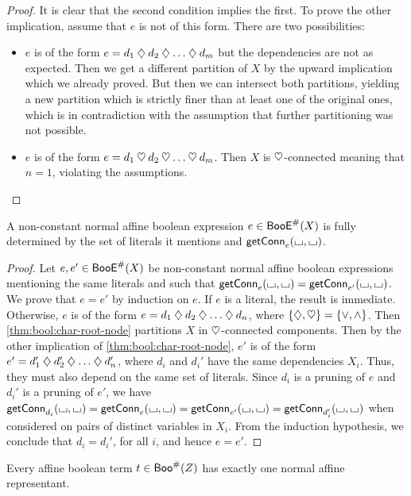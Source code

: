 \documentclass[a4paper]{memoir}
\begin{document}
\begin{proof}
	It is clear that the second condition implies the first.
	To prove the other implication, assume that $e$ is not of this form.
	There are two possibilities:
	\begin{itemize}
		\item $e$ is of the form $e = d_1 \mathbin{\diamondsuit} d_2 \mathbin{\diamondsuit} \ldots \mathbin{\diamondsuit} d_m$ but the dependencies are not as expected.
		Then we get a different partition of $X$ by the upward implication which we already proved.
		But then we can intersect both partitions, yielding a new partition which is strictly finer than at least one of the original ones, which is in contradiction with the assumption that further partitioning was not possible.
		\item $e$ is of the form $e = d_1 \mathbin{\heartsuit} d_2 \mathbin{\heartsuit} \ldots \mathbin{\heartsuit} d_m$. Then $X$ is $\mathbin{\heartsuit}$-connected meaning that $n = 1$, violating the assumptions. \qedhere
	\end{itemize}
\end{proof}
\begin{lemma} \label{thm:bool:normal-from-graph}
	A non-constant normal affine boolean expression $e \in \mathsf{BooE}^\#(X)$ is fully determined by the set of literals it mentions and $\mathsf{getConn}_{e}({\llcorner\hspace{-.4ex}\lrcorner}, {\llcorner\hspace{-.4ex}\lrcorner})$.
\end{lemma}
\begin{proof}
	Let $e, e' \in \mathsf{BooE}^\#(X)$ be non-constant normal affine boolean expressions mentioning the same literals and such that $\mathsf{getConn}_{e}({\llcorner\hspace{-.4ex}\lrcorner}, {\llcorner\hspace{-.4ex}\lrcorner}) = \mathsf{getConn}_{e'}({\llcorner\hspace{-.4ex}\lrcorner}, {\llcorner\hspace{-.4ex}\lrcorner})$.
	We prove that $e = e'$ by induction on $e$.
	If $e$ is a literal, the result is immediate.
	Otherwise, $e$ is of the form $e = d_1 \mathbin{\diamondsuit} d_2 \mathbin{\diamondsuit} \ldots \mathbin{\diamondsuit} d_n$, where $\mathopen{}\left\{ {\mathbin{\diamondsuit}}, {\mathbin{\heartsuit}} \right\}\mathclose{} = \mathopen{}\left\{ {\vee}, {\wedge} \right\}\mathclose{}$.
	Then \cref{thm:bool:char-root-node} partitions $X$ in $\mathbin{\heartsuit}$-connected components.
	Then by the other implication of \cref{thm:bool:char-root-node}, $e'$ is of the form $e' = d_1' \mathbin{\diamondsuit} d_2' \mathbin{\diamondsuit} \ldots \mathbin{\diamondsuit} d_n'$, where $d_i$ and $d_i'$ have the same dependencies $X_i$.
	Thus, they must also depend on the same set of literals.
	Since $d_i$ is a pruning of $e$ and $d_i'$ is a pruning of $e'$, we have $\mathsf{getConn}_{d_i}({\llcorner\hspace{-.4ex}\lrcorner}, {\llcorner\hspace{-.4ex}\lrcorner}) = \mathsf{getConn}_{e}({\llcorner\hspace{-.4ex}\lrcorner}, {\llcorner\hspace{-.4ex}\lrcorner}) = \mathsf{getConn}_{e'}({\llcorner\hspace{-.4ex}\lrcorner}, {\llcorner\hspace{-.4ex}\lrcorner}) = \mathsf{getConn}_{d_i'}({\llcorner\hspace{-.4ex}\lrcorner}, {\llcorner\hspace{-.4ex}\lrcorner})$ when considered on pairs of distinct variables in $X_i$.
	From the induction hypothesis, we conclude that $d_i = d_i'$, for all $i$, and hence $e = e'$.
\end{proof}
\begin{theorem} \label{thm:bool:normalization}
	Every affine boolean term $t \in \mathsf{Boo}^\#(Z)$ has exactly one normal affine representant.
\end{theorem}
\end{document}
